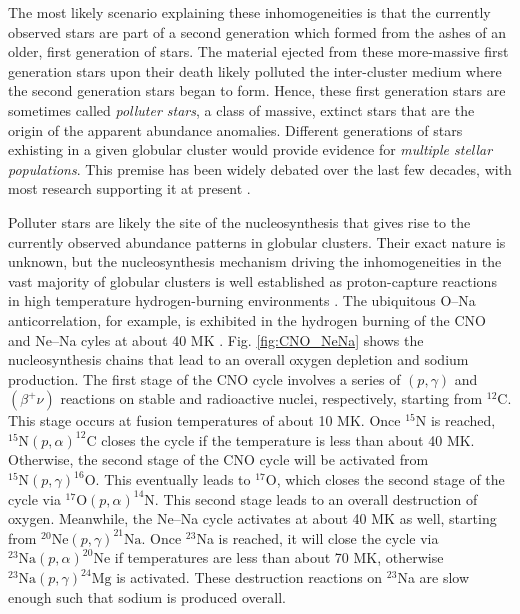 The most likely scenario explaining these inhomogeneities is that the currently observed stars are part of a second generation which formed from the ashes of an older, first generation of stars. The material ejected from these more-massive first generation stars upon their death likely polluted the inter-cluster medium where the second generation stars began to form. Hence, these first generation stars are sometimes called \emph{polluter stars}, a class of massive, extinct stars that are the origin of the apparent abundance anomalies. Different generations of stars exhisting in a given globular cluster would provide evidence for \emph{multiple stellar populations}. This premise has been widely debated over the last few decades, with most research supporting it at present \cite{Gratton2004,Gratton2012,Gratton2019}.


Polluter stars are likely the site of the nucleosynthesis that gives rise to the currently observed abundance patterns in globular clusters. Their exact nature is unknown, but the nucleosynthesis mechanism driving the inhomogeneities in the vast majority of globular clusters is well established as proton-capture reactions in high temperature hydrogen-burning environments \cite{Denisenkov1989,Langer1993}. The ubiquitous O--Na anticorrelation, for example, is exhibited in the hydrogen burning of the CNO and Ne--Na cyles at about 40 MK \cite{Gratton2019}. Fig. \ref{fig:CNO_NeNa} shows the nucleosynthesis chains that lead to an overall oxygen depletion and sodium production. The first stage of the CNO cycle involves a series of $(p, \gamma)$ and $(\beta^{+}\nu)$ reactions on stable and radioactive nuclei, respectively, starting from $^{12}$C. This stage occurs at fusion temperatures of about 10 MK. Once $^{15}$N is reached, $^{15}\mathrm{N}(p, \alpha)^{12}\mathrm{C}$ closes the cycle if the temperature is less than about 40 MK. Otherwise, the second stage of the CNO cycle will be activated from $^{15}\mathrm{N}(p, \gamma)^{16}\mathrm{O}$. This eventually leads to $^{17}$O, which closes the second stage of the cycle via $^{17}\mathrm{O}(p, \alpha)^{14}\mathrm{N}$. This second stage leads to an overall destruction of oxygen. Meanwhile, the Ne--Na cycle activates at about 40 MK as well, starting from $^{20}\mathrm{Ne}(p, \gamma)^{21}\mathrm{Na}$. Once $^{23}$Na is reached, it will close the cycle via $^{23}\mathrm{Na}(p, \alpha)^{20}\mathrm{Ne}$ if temperatures are less than about 70 MK, otherwise $^{23}\mathrm{Na}(p, \gamma)^{24}\mathrm{Mg}$ is activated. These destruction reactions on $^{23}$Na are slow enough such that sodium is produced overall.

